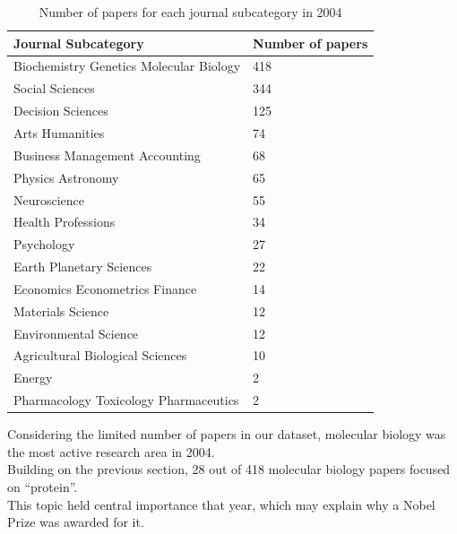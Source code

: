 \documentclass{article}
\begin{document}
\begin{table}[H]
	\caption{Number of papers for each journal subcategory in 2004}
	\centering
	\begin{tabular}{|l|l|}
		\hline
		\textbf{Journal Subcategory}            & \textbf{Number of papers} \\ \hline
		Biochemistry Genetics Molecular Biology & 418                       \\ \hline
		Social Sciences                         & 344                       \\ \hline
		Decision Sciences                       & 125                       \\ \hline
		Arts Humanities                         & 74                        \\ \hline
		Business Management Accounting          & 68                        \\ \hline
		Physics Astronomy                       & 65                        \\ \hline
		Neuroscience                            & 55                        \\ \hline
		Health Professions                      & 34                        \\ \hline
		Psychology                              & 27                        \\ \hline
		Earth Planetary Sciences                & 22                        \\ \hline
		Economics Econometrics Finance          & 14                        \\ \hline
		Materials Science                       & 12                        \\ \hline
		Environmental Science                   & 12                        \\ \hline
		Agricultural Biological Sciences        & 10                        \\ \hline
		Energy                                  & 2                         \\ \hline
		Pharmacology Toxicology Pharmaceutics   & 2                         \\ \hline
	\end{tabular}
	\label{tab:papersPerSubcategoryPerYear}
\end{table}

Considering the limited number of papers in our dataset, molecular biology
was the most active research area in 2004.\\
Building on the previous section, 28 out of 418 molecular biology papers
focused on ``protein''.\\
This topic held central importance that year, which may explain why a Nobel
Prize was awarded for it.
\end{document}
